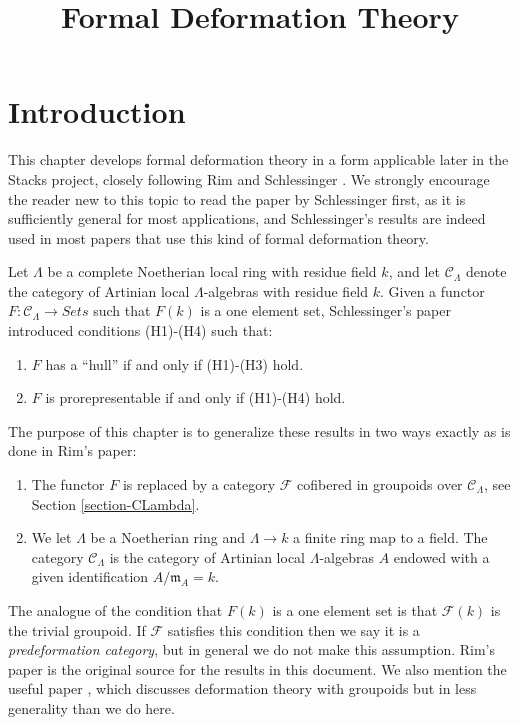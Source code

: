 \documentclass{stacks-project}
\theoremstyle{plain}
\theoremstyle{definition}
\theoremstyle{remark}
\numberwithin{equation}{subsection}
\begin{document}
\title{Formal Deformation Theory}


\maketitle

\label{section-phantom}

\tableofcontents



\section{Introduction}
\label{section-introduction}

\noindent
This chapter develops formal deformation theory in a form applicable
later in the Stacks project, closely following Rim \cite[Exposee VI]{SGA7-I}
and Schlessinger \cite{Sch}. We strongly encourage the reader new to
this topic to read the paper by Schlessinger first, as it is sufficiently
general for most applications, and Schlessinger's results are indeed
used in most papers that use this kind of formal deformation theory.

\medskip\noindent
Let $\Lambda$ be a complete Noetherian local ring with residue field $k$,
and let $\mathcal{C}_\Lambda$ denote the category of Artinian local
$\Lambda$-algebras with residue field $k$. Given a functor
$F : \mathcal{C}_\Lambda \to \textit{Sets}$ such that $F(k)$
is a one element set, Schlessinger's paper introduced conditions
(H1)-(H4) such that:
\begin{enumerate}
\item $F$ has a ``hull'' if and only if (H1)-(H3) hold.
\item $F$ is prorepresentable if and only if (H1)-(H4) hold.
\end{enumerate}
The purpose of this chapter is to generalize these results in two ways
exactly as is done in Rim's paper:
\begin{enumerate}
\item[(A)] The functor $F$ is replaced by a category $\mathcal{F}$ cofibered
in groupoids over $\mathcal{C}_\Lambda$, see
Section \ref{section-CLambda}.
\item[(B)] We let $\Lambda$ be a Noetherian ring and $\Lambda \to k$
a finite ring map to a field. The category $\mathcal{C}_\Lambda$ is
the category of Artinian local $\Lambda$-algebras $A$ endowed with a
given identification $A/\mathfrak m_A = k$.
\end{enumerate}
The analogue of the condition that $F(k)$ is a  one element set is that
$\mathcal{F}(k)$ is the trivial groupoid. If $\mathcal{F}$ satisfies this
condition then we say it is a {\it predeformation category}, but in  general
we do not make this assumption.  Rim's paper \cite[Exposee VI]{SGA7-I} is the
original source for the results in this document. We also mention the useful
paper \cite{Talpo-Vistoli}, which discusses deformation theory with groupoids
but in less generality than we do here.
\end{document}

